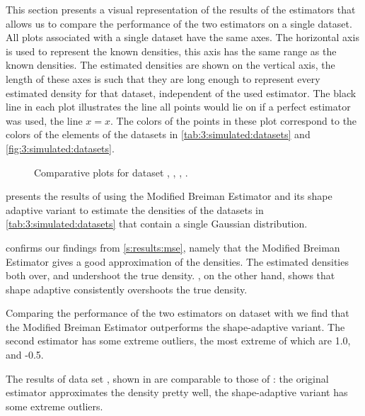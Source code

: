 This section presents a visual representation of the results of the estimators that allows us to compare the performance of the two estimators on a single dataset. All plots associated with a single dataset have the same axes. The horizontal axis is used to represent the known densities, this axis has the same range as the known densities. The estimated densities are shown on the vertical axis, the length of these axes is such that they are long enough to represent every estimated density for that dataset, independent of the used estimator. The black line in each plot illustrates the line all points would lie on if a perfect estimator was used, \ie the line $x = x$. The colors of the points in these plot correspond to the colors of the elements of the datasets in \cref{tab:3:simulated:datasets} and \cref{fig:3:simulated:datasets}.

\begin{figure*}
	\centering
	
	\caption{Comparative plots for dataset \ferdosiOne, \baakmanOne, \baakmanFour, \baakmanFive.}
	\label{fig:4:results:singleSphere}
\end{figure*}

 presents the results of using the Modified Breiman Estimator and its shape adaptive variant to estimate the densities of the datasets in \cref{tab:3:simulated:datasets} that contain a single Gaussian distribution. 

 confirms our findings from \cref{s:results:mse}, namely that the Modified Breiman Estimator gives a good approximation of the densities. The estimated densities both over, and undershoot the true density. , on the other hand, shows that shape adaptive \mbe consistently overshoots the true density. 

Comparing the performance of the two estimators on dataset \numberstringnum{\baakmanOneNum} with  we find that the Modified Breiman Estimator outperforms the shape-adaptive variant. The second estimator has some extreme outliers, the most extreme of which are 1.0, and -0.5. 

The results of data set \numberstringnum{\baakmanFourNum}, shown in  are comparable to those of \numberstringnum{\baakmanOneNum}: the original estimator approximates the density pretty well, the shape-adaptive variant has some extreme outliers.

